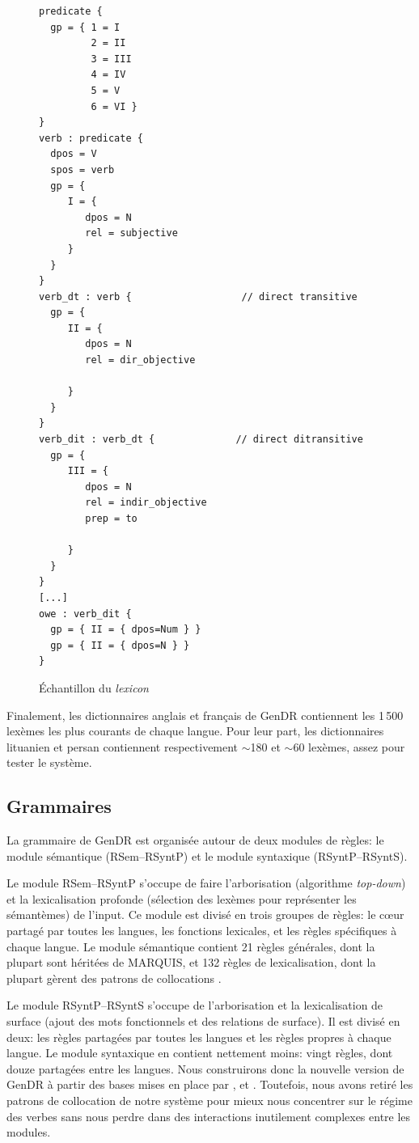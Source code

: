 \begin{figure}
  \caption{Échantillon du \emph{lexicon}}
	\label{fig:lexicon}
\begin{lstlisting}[language=mate]
predicate {
  gp = { 1 = I
         2 = II
         3 = III
         4 = IV
         5 = V
         6 = VI }
}
verb : predicate {
  dpos = V
  spos = verb
  gp = {
     I = {
        dpos = N
        rel = subjective
     }
  }
}
verb_dt : verb {                   // direct transitive
  gp = {
     II = {
        dpos = N
        rel = dir_objective

     }
  }
}
verb_dit : verb_dt {              // direct ditransitive
  gp = {
     III = {
        dpos = N
        rel = indir_objective
        prep = to  

     }
  }
}
[...]
owe : verb_dit {
  gp = { II = { dpos=Num } }
  gp = { II = { dpos=N } }
}
\end{lstlisting}
\end{figure}

Finalement, les dictionnaires anglais et français de GenDR contiennent les 1\,500 lexèmes les plus courants de chaque langue. Pour leur part, les dictionnaires lituanien \citep{dubinskaite17} et persan contiennent respectivement $\sim$180 et $\sim$60 lexèmes, assez pour tester le système.


\subsection{Grammaires}
La grammaire de GenDR est organisée autour de deux modules de règles: le module sémantique (\ac{RSem}--\ac{RSyntP}) et le module syntaxique (\ac{RSyntP}--\ac{RSyntS}).

Le module \ac{RSem}--\ac{RSyntP} s'occupe de faire l'arborisation (algorithme \emph{top-down}) et la lexicalisation profonde (sélection des lexèmes pour représenter les sémantèmes) de l'input. Ce module est divisé en trois groupes de règles: le c\oe{}ur partagé par toutes les langues, les fonctions lexicales, et les règles spécifiques à chaque langue. Le module sémantique contient 21 règles générales, dont la plupart sont héritées de MARQUIS, et 132 règles de lexicalisation, dont la plupart gèrent des patrons de collocations \citep{LambreyImplementationcollocationspour2017}.

Le module \ac{RSyntP}--\ac{RSyntS} s'occupe de l'arborisation et la lexicalisation de surface (ajout des mots fonctionnels et des relations de surface). Il est divisé en deux: les règles partagées par toutes les langues et les règles propres à chaque langue. Le module syntaxique en contient nettement moins: vingt règles, dont douze partagées entre les langues. Nous construirons donc la nouvelle version de GenDR à partir des bases mises en place par \cite{LambreyImplementationcollocationspour2017}, \cite{dubinskaite17} et \cite{lareau18}. Toutefois, nous avons retiré les patrons de collocation de notre système pour mieux nous concentrer sur le régime des verbes sans nous perdre dans des interactions inutilement complexes entre les modules.

